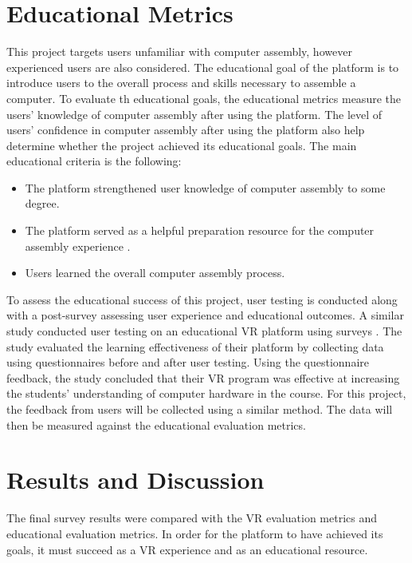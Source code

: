 \documentclass[10pt,twocolumn]{article}
\begin{document}
\section{Educational Metrics}

\par This project targets users unfamiliar with computer assembly, however experienced users are also considered. The educational goal of the platform is to introduce users to the overall process and skills necessary to assemble a computer. To evaluate th educational goals, the educational metrics measure the users' knowledge of computer assembly after using the platform. The level of users' confidence in computer assembly after using the platform also help determine whether the project achieved its educational goals. The main educational criteria is the following: 

\begin{itemize}
    \item The platform strengthened user knowledge of computer assembly to some degree. 
    \item The platform served as a helpful preparation resource for the computer assembly experience .
    \item Users learned the overall computer assembly process.
\end{itemize}

\par To assess the educational success of this project, user testing is conducted along with a post-survey assessing user experience and educational outcomes. A similar study conducted user testing on an educational VR platform using surveys \cite{Chen2011AVirtualRealityExperiment}. The study evaluated the learning effectiveness of their platform by collecting data using questionnaires before and after user testing. Using the questionnaire feedback, the study concluded that their VR program was effective at increasing the students’ understanding of computer hardware in the course. For this project, the feedback from users will be collected using a similar method. The data will then be measured against the educational evaluation metrics.

\section{Results and Discussion}

\par The final survey results were compared with the VR evaluation metrics and educational evaluation metrics. In order for the platform to have achieved its goals, it must succeed as a VR experience and as an educational resource. 
\end{document}
